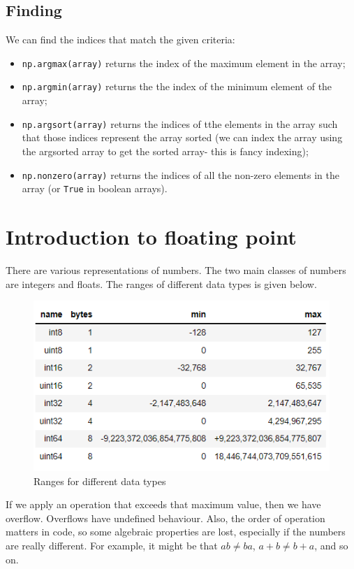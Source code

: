 \documentclass[a4paper, openany]{memoir}
\begin{document}
    \subsection{Finding}
    We can find the indices that match the given criteria:
    \begin{itemize}
        \item \texttt{np.argmax(array)} returns the index of the maximum element in the array;
        \item \texttt{np.argmin(array)} returns the the index of the minimum element of the array;
        \item \texttt{np.argsort(array)} returns the indices of tthe elements in the array such that those indices represent the array sorted (we can index the array using the argsorted array to get the sorted array- this is fancy indexing);
        \item \texttt{np.nonzero(array)} returns the indices of all the non-zero elements in the array (or \texttt{True} in boolean arrays).
    \end{itemize}

    \section{Introduction to floating point}
    There are various representations of numbers. The two main classes of numbers are integers and floats. The ranges of different data types is given below.
    \begin{figure}[H]
        \centering
        \includegraphics[scale=0.9]{src/1.1 ranges for different types.PNG}
        \caption{Ranges for different data types}
    \end{figure}
    \noindent If we apply an operation that exceeds that maximum value, then we have overflow. Overflows have undefined behaviour. Also, the order of operation matters in code, so some algebraic properties are lost, especially if the numbers are really different. For example, it might be that $ab \neq ba$, $a + b \neq b + a$, and so on.
    
\end{document}
